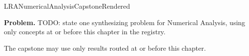\ifcsname LRANumericalAnalysisCapstoneRendered\endcsname
\else
\expandafter\gdef\csname LRANumericalAnalysisCapstoneRendered\endcsname{}

\newpage
{}
\label{cap:numerical-analysis}

\begin{tcolorbox}[
  colback=gray!6,
  colframe=gray!40,
  arc=2pt,
  left=8pt, right=8pt, top=6pt, bottom=6pt,
  title={\small\textbf{Capstone Problem}},
  fonttitle=\small\bfseries
]
\textbf{Problem.}
TODO: state one synthesizing problem for Numerical Analysis, using only concepts at or
before this chapter in the registry.
\end{tcolorbox}

\begin{remark*}
The capstone may use only results routed at or before this chapter.
\end{remark*}

\clearpage
\fi

